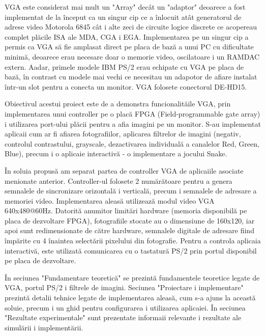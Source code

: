 \documentclass[a4paper,11pt,romanian]{article}
\begin{document}
VGA este considerat mai mult un "Array" dec\^{a}t un "adaptor" deoarece a fost implementat de la \^{i}nceput ca un singur cip ce a \^{i}nlocuit at\^{a}t  generatorul de adrese video Motorola 6845 c\^{a}t i alte zeci de circuite logice discrete ce acopereau complet pl\u{a}cile ISA ale MDA, CGA i EGA. Implementarea pe un singur cip a permis ca VGA s\u{a} fie amplasat direct pe placa de baz\u{a} a unui PC cu dificultate minim\u{a}, deoarece erau necesare doar o memorie video, oscilatoare i un RAMDAC extern. Aadar, primele modele IBM PS/2 erau echipate cu VGA pe placa de baz\u{a}, \^{i}n contrast cu modele mai vechi ce necesitau un adapotor de afiare instalat \^{i}ntr-un slot pentru a conecta un monitor. VGA folosete conectorul DE-HD15. ~\cite{wiki:vga}

Obiectivul acestui proiect este de a demonstra funcionalit\u{a}ile VGA, prin implementarea unui controller pe o plac\u{a} FPGA (Field-programmable gate array) i utilizarea port-ului pl\u{a}cii pentru a afia imagini pe un monitor. S-au implementat aplicaii cum ar fi afiarea fotografiilor, aplicarea filtrelor de imagini (negativ, controlul contrastului, grayscale, dezactivarea individual\u{a} a canalelor Red, Green, Blue), precum i o aplicaie interactiv\u{a} - o implementare a jocului Snake.

\^{I}n soluia propus\u{a} am separat partea de controller VGA de aplicaiile asociate menionate anterior. Controller-ul folosete 2 num\u{a}r\u{a}toare pentru a genera semnalele de sincronizare orizontal\u{a} i vertical\u{a}, precum i semnalele de adresare a memoriei video.  Implementarea aleas\u{a} utilizeaz\u{a} modul video VGA 640x480@60Hz. Datorit\u{a} anumitor limit\u{a}ri hardware (memoria disponibil\u{a} pe placa de dezvoltare FPGA), fotografiile stocate au o dimensiune de 160x120, iar apoi sunt redimensionate de c\u{a}tre hardware, semnalele digitale de adresare fiind \^{i}mp\u{a}rite cu 4 \^{i}naintea select\u{a}rii pixelului din fotografie. Pentru a controla aplicaia interactiv\u{a}, este utilizat\u{a} comunicarea cu o tastatur\u{a} PS/2 prin portul disponibil pe placa de dezvoltare.

\^{I}n seciunea "Fundamentare teoretic\u{a}" se prezint\u{a} fundamentele teoretice legate de VGA, portul PS/2 i filtrele de imagini. Seciunea "Proiectare i implementare" prezint\u{a} detalii tehnice legate de implementarea aleas\u{a}, cum s-a ajuns la aceast\u{a} soluie, precum i un ghid pentru configurarea i utilizarea aplicaiei. \^{I}n seciunea "Rezultate experimentale" sunt prezentate informaii relevante i rezultate ale simul\u{a}rii i implement\u{a}rii.
\end{document}
